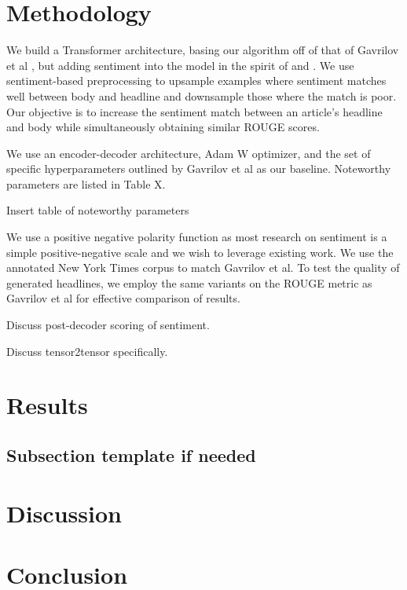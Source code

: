 \documentclass[11pt]{article}
\begin{document}
\section{Methodology}
We build a Transformer architecture, basing our algorithm off of that of Gavrilov et al \cite{DBLP:journals/corr/abs-1901-07786}, but adding sentiment into the model in the spirit of \cite{DBLP:journals/corr/abs-1802-09426} and \cite{DBLP:journals/corr/HuYLSX17}. We use sentiment-based preprocessing to upsample examples where sentiment matches well between body and headline and downsample those where the match is poor. Our objective is to increase the sentiment match between an article's headline and body while simultaneously obtaining similar ROUGE scores.

We use an encoder-decoder architecture, Adam W optimizer, and the set of specific hyperparameters outlined by Gavrilov et al \cite{DBLP:journals/corr/abs-1901-07786} as our baseline. Noteworthy parameters are listed in Table X.

Insert table of noteworthy parameters

We use a positive negative polarity function as most research on sentiment is a simple positive-negative scale and we wish to leverage existing work. We use the annotated New York Times corpus to match Gavrilov et al. 
To test the quality of generated headlines, we employ the same variants on the ROUGE metric as Gavrilov et al for effective comparison of results.

Discuss post-decoder scoring of sentiment.

Discuss tensor2tensor specifically.

\section{Results}
\subsection{Subsection template if needed}
\section{Discussion}
\section{Conclusion}
\end{document}
